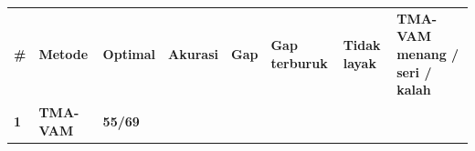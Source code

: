 \documentclass[10pt,a4paper]{article}
\newcounter{none}
\begin{document}
{\def\LTcaptype{none} %
\begin{longtable}[]{@{}
  >{\raggedright\arraybackslash}p{}
  >{\raggedright\arraybackslash}p{}
  >{\raggedright\arraybackslash}p{}
  >{\raggedright\arraybackslash}p{}
  >{\raggedright\arraybackslash}p{}
  >{\raggedright\arraybackslash}p{}
  >{\raggedright\arraybackslash}p{}
  >{\raggedright\arraybackslash}p{}@{}}
\toprule\noalign{}
\begin{minipage}[b]{\linewidth}\raggedright
\textbf{\#}
\end{minipage} & \begin{minipage}[b]{\linewidth}\centering
\textbf{Metode}
\end{minipage} & \begin{minipage}[b]{\linewidth}\centering
\textbf{Optimal}
\end{minipage} & \begin{minipage}[b]{\linewidth}\centering
\textbf{Akurasi}
\end{minipage} & \begin{minipage}[b]{\linewidth}\centering
\textbf{Gap}
\end{minipage} & \begin{minipage}[b]{\linewidth}\centering
\textbf{Gap terburuk}
\end{minipage} & \begin{minipage}[b]{\linewidth}\centering
\textbf{Tidak layak}
\end{minipage} & \begin{minipage}[b]{\linewidth}\centering
\textbf{TMA-VAM menang / seri / kalah}
\end{minipage} \\
\begin{minipage}[b]{\linewidth}\raggedright
\textbf{1}
\end{minipage} & \begin{minipage}[b]{\linewidth}\centering
\textbf{TMA-VAM}
\end{minipage} & \begin{minipage}[b]{\linewidth}\centering
\textbf{55/69}
\end{minipage} & \begin{minipage}[b]{\linewidth}\centering

\end{minipage}
\end{longtable}}
\end{document}
